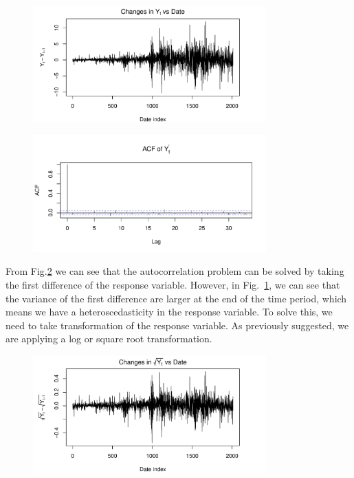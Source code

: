 \documentclass[conference,onecolumn,11pt]{IEEEtran}
\begin{document}
\begin{figure}[htpb]
	\centering
	\includegraphics[width=0.8\textwidth]{pic/AdjClosed.pdf}
	\caption{}
	\label{fig:d}
\end{figure}

\begin{figure}[htpb]
	\centering
	\includegraphics[width=0.8\textwidth]{pic/ACF_dAdjClosed.pdf}
	\caption{}
	\label{fig:acf2}
\end{figure}

From Fig.\ref{fig:acf2} we can see that the autocorrelation problem can be solved by taking the first difference of the response variable. However, in Fig.~\ref{fig:d}, we can see that the variance of the first difference are larger at the end of the time period, which means we have a heteroscedasticity in the response variable. To solve this, we need to take transformation of the response variable. As previously suggested, we are applying a log or square root transformation.


\begin{figure}[htpb]
	\centering
	\includegraphics[width=0.8\textwidth]{pic/Sqrt_AdjClosed.pdf}
	\caption{}
	\label{fig:dsqrt}
\end{figure}
\end{document}

